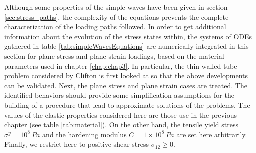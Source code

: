 Although some properties of the simple waves have been given in section \ref{sec:stress_paths}, the complexity of the equations prevents the complete characterization of the loading paths followed.
In order to get additional information about the evolution of the stress states within, the systems of ODEs gathered in table \ref{tab:simpleWavesEquations} are numerically integrated in this section for plane stress and plane strain loadings, based on the material parameters used in chapter \ref{chap:chap3}.
In particular, the thin-walled tube problem considered by Clifton \cite{Clifton} is first looked at so that the above developments can be validated.
Next, the plane stress and plane strain cases are treated.
The identified behaviors should provide some simplification assumptions for the building of a procedure that lead to approximate solutions of the problems.
The values of the elastic properties considered here are those use in the previous chapter (see table \ref{tab:material}).
On the other hand, the tensile yield stress $\sigma^y=10^{8} \: Pa$ and the hardening modulus $C=1\times10^8 \: Pa$ are set here arbitrarily.
Finally, we restrict here to positive shear stress $\sigma_{12}\geq 0$.
